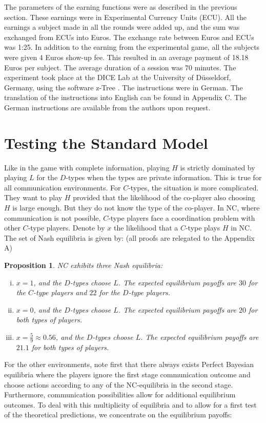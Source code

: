 \documentclass[12pt]{article}
\newtheorem{proposition}{Proposition} \theoremstyle{definition}
\theoremstyle{break}
\begin{document}
The parameters of the earning functions were as described in the previous section. These earnings were in Experimental Currency Units (ECU). All the earnings a subject made in all the rounds were added up, and the sum was exchanged from ECUs into Euros. The exchange rate between Euros and ECUs was 1:25. In addition to the earning from the experimental game, all the subjects were given 4 Euros show-up fee. This resulted in an average payment of 18.18 Euros per subject. The average duration of a session was 70 minutes. The experiment took place at the DICE Lab at the University of D\"{u}sseldorf, Germany, using the software z-Tree \citep{fischbacher2007}. The instructions were in German. The translation of the instructions into English can be found in Appendix C. The German instructions are available from the authors upon request.

\section{Testing the Standard Model}\label{sec:standard-setting}

Like in the game with complete information, playing $H$ is strictly dominated by playing $L$ for the $D$-types when the types are private information. This is true for all communication environments. For $C$-types, the situation is more complicated. They want to play $H$ provided that the likelihood of the co-player also choosing $H$ is large enough. But they do not know the type of the co-player. In NC, where communication is not possible, $C$-type players face a coordination problem with other $C$-type players. Denote by $x$ the likelihood that a $C$-type plays $H$ in NC. The set of Nash equilibria is given by: (all proofs are relegated to the Appendix A)
%
\begin{proposition}\label{prop:NC} NC exhibits three Nash equilibria:
	\begin{enumerate}[i)]\setlength\itemsep{0em}
		\item $x = 1$, and the $D$-types choose $L$. The expected equilibrium payoffs are $30$ for the $C$-type players and $22$ for the $D$-type players.
		\item $x = 0$, and the $D$-types choose $L$. The expected equilibrium payoffs are $20$ for both types of  players.
		\item $x = \frac{5}{9}\approx 0.56$, and the $D$-types choose $L$. The expected equilibrium payoffs are $21.1$ for both types of players.
	\end{enumerate}
\end{proposition}
%
For the other environments, note first that there always exists Perfect Bayesian equilibria where the players ignore the first stage communication outcome and choose actions according to any of the NC-equilibria in the second stage. Furthermore, communication possibilities allow for additional equilibrium outcomes. To deal with this multiplicity of equilibria and to allow for a first test of the theoretical predictions, we concentrate on the equilibrium payoffs: 
\end{document}
